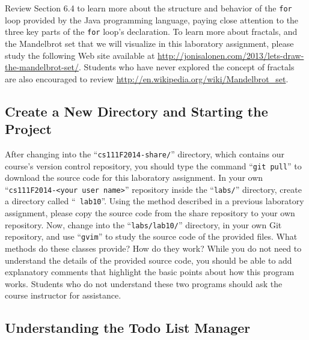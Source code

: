 Review Section 6.4 to learn more about the structure and behavior of the {\tt for} loop provided by the Java programming
language, paying close attention to the three key parts of the {\tt for} loop's declaration. To learn more about
fractals, and the Mandelbrot set that we will visualize in this laboratory assignment, please study the following Web
site available at \url{http://jonisalonen.com/2013/lets-draw-the-mandelbrot-set/}. Students who have never explored the
concept of fractals are also encouraged to review \url{http://en.wikipedia.org/wiki/Mandelbrot_set}.

\vspace{-0.1in}
\subsection*{Create a New Directory and Starting the Project}
\vspace{-0.05in}

After changing into the ``{\tt cs111F2014-share/}'' directory, which contains our course's version control repository,
you should type the command ``{\tt git pull}'' to download the source code for this laboratory assignment.  In your own
``{\tt cs111F2014-<your user name>}'' repository inside the ``{\tt labs/}'' directory, create a directory called ``{\tt
  lab10}''. Using the method described in a previous laboratory assignment, please copy the source code from the share
repository to your own repository. Now, change into the ``{\tt labs/lab10/}'' directory, in your own Git repository, and
use ``{\tt gvim}'' to study the source code of the provided files. What methods do these classes provide? How do they
work? While you do not need to understand the details of the provided source code, you should be able to add explanatory
comments that highlight the basic points about how this program works. Students who do not understand these two programs
should ask the course instructor for assistance.


\vspace{-0.1in}
\subsection*{Understanding the Todo List Manager}
\vspace{-0.05in}










\vspace{-0.3in}
